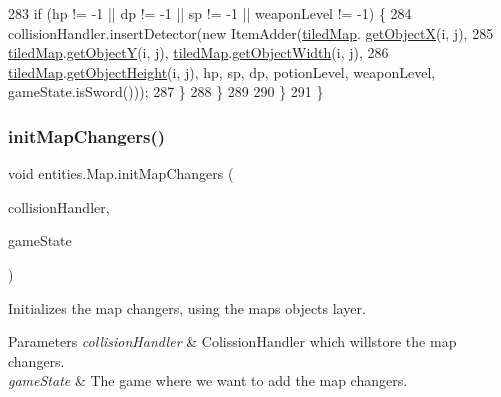 \begin{DoxyCode}
283                 \textcolor{keywordflow}{if} (hp != -1 || dp != -1 || sp != -1 || weaponLevel != -1) \{
284                     collisionHandler.insertDetector(\textcolor{keyword}{new} ItemAdder(\mbox{\hyperlink{classentities_1_1_map_a94a743ccd80946422fcbdb5ba1cc966b}{tiledMap}}.
      \mbox{\hyperlink{classorg_1_1newdawn_1_1slick_1_1tiled_1_1_tiled_map_a1f3254dc5845b361c2cbde74f587d4c1}{getObjectX}}(i, j),
285                             \mbox{\hyperlink{classentities_1_1_map_a94a743ccd80946422fcbdb5ba1cc966b}{tiledMap}}.\mbox{\hyperlink{classorg_1_1newdawn_1_1slick_1_1tiled_1_1_tiled_map_a690410873e8b1ddcf677545432fb44f7}{getObjectY}}(i, j), 
      \mbox{\hyperlink{classentities_1_1_map_a94a743ccd80946422fcbdb5ba1cc966b}{tiledMap}}.\mbox{\hyperlink{classorg_1_1newdawn_1_1slick_1_1tiled_1_1_tiled_map_afa4bb340b71651c7ac0b0a372f22ab60}{getObjectWidth}}(i, j),
286                             \mbox{\hyperlink{classentities_1_1_map_a94a743ccd80946422fcbdb5ba1cc966b}{tiledMap}}.\mbox{\hyperlink{classorg_1_1newdawn_1_1slick_1_1tiled_1_1_tiled_map_a2da39e5d72913b52ebb5a12397724f96}{getObjectHeight}}(i, j), hp, sp, dp, potionLevel,
       weaponLevel, gameState.isSword()));
287                 \}
288             \}
289 
290         \}
291     \}
\end{DoxyCode}
\mbox{\label{classentities_1_1_map_a7ac25d4d491cdb9d26421146fc622978}} 
\subsubsection{\texorpdfstring{init\+Map\+Changers()}{initMapChangers()}}
{\footnotesize\ttfamily void entities.\+Map.\+init\+Map\+Changers (\begin{DoxyParamCaption}\item[{\mbox{\hyperlink{classentities_1_1_collision_handler}{Collision\+Handler}}}]{collision\+Handler,  }\item[{\mbox{\hyperlink{classstates_1_1_game_state}{Game\+State}}}]{game\+State }\end{DoxyParamCaption})\hspace{0.3cm}{\ttfamily [inline]}}

Initializes the map changers, using the map\textquotesingle{}s objects layer.


\begin{DoxyParams}{Parameters}
{\em collision\+Handler} & Colission\+Handler which willstore the map changers. \\
\hline
{\em game\+State} & The game where we want to add the map changers. \\
\hline
\end{DoxyParams}

